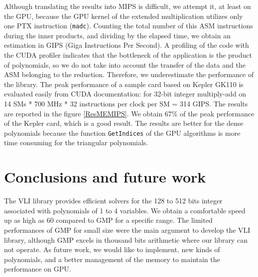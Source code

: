 \documentclass[oribibl]{llncs2e/llncs}
\begin{document}
Although translating the results into MIPS is difficult, we attempt it, at least on the GPU, because the GPU kernel of the extended multiplication utilizes only one PTX instruction (\texttt{madc}).  Counting the total number of  this ASM instructions during  the inner products, and dividing by the elapsed time, we obtain an estimation in GIPS (Giga Instructions Per Second). A  profiling of the code with the CUDA profiler indicates that the bottleneck of the application is the product of polynomials, so we do not take into account   the transfer of the data and the ASM belonging  to the reduction. Therefore, we underestimate the performance of the library.
The peak performance of  a sample card based on Kepler GK110 is evaluated easily from CUDA documentation: for 32-bit integer multiply-add on 14 SMs * 700 MHz * 32 instructions per clock per SM = 314 GIPS. The results are reported in the figure \ref{ResMEMIPS}. We obtain 67\% of the peak performance of the Kepler card, which is a good result. The results are better for the dense polynomials because the function \texttt{GetIndices}  of the GPU algorithms is more time consuming for the triangular polynomials.

\section{Conclusions and future work}

The VLI library provides efficient solvers for the 128 to 512 bits integer associated with polynomials of 1 to 4 variables. We obtain a comfortable speed up as high as  60 compared 
to GMP for a specific range. The limited performances of GMP for small size were the main argument to develop the VLI library, although GMP excels in thousand bits arithmetic where our library can not operate. 
As future work, we would like to implement, new kinds of polynomials, and a better management 
of  the memory to maintain the performance on GPU.



\end{document}
